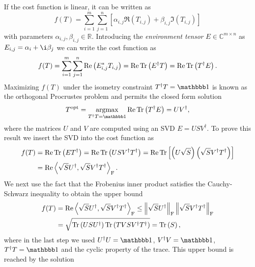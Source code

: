 If the cost function is linear, it can be written as
\begin{equation}
	f(T) = \sum_{i=1}^{m}\sum_{j=1}^{n}\left[\alpha_{i,j}\Re\left(T_{i,j}\right) + \beta_{i,j} \Im\left(T_{i,j}\right)\right]
\end{equation}
with parameters $\alpha_{i,j}, \beta_{i,j} \in \mathbb{R}$. Introducing the \textit{environment tensor} $E\in\mathbb{C}^{m\times n}$ as $E_{i,j} = \alpha_i + \i \beta_j$ we can write the cost function as
\begin{equation}
	f(T) = \sum_{i=1}^{m}\sum_{j=1}^{n} \operatorname{Re}\left(E_{i,j}^*T_{i,j}\right) = \operatorname{Re}\operatorname{Tr}\left(E^\dagger T\right) = \operatorname{Re}\operatorname{Tr}\left(T^\dagger E\right).
\end{equation}
Maximizing $f(T)$ under the isometry constraint $T^\dagger T = \id$ is known as the orthogonal Procrustes problem and permits the closed form solution
\begin{equation}
	\label{eq:orthogonal_procrustes_problem_closed_form_solution}
	T^\text{opt} = \underset{T^\dagger T = \id}{\argmax} \Re\Tr\left(T^\dagger E\right) = UV^\dagger,
\end{equation}
where the matrices $U$ and $V$ are computed using an SVD $E = USV^\dagger$. To prove this result we insert the SVD into the cost function as
\begin{equation}
	\begin{split}
	f(T) &= \operatorname{Re}\operatorname{Tr}\left(ET^\dagger\right) = \operatorname{Re}\operatorname{Tr}\left(USV^\dagger T^\dagger\right) = \operatorname{Re}\operatorname{Tr}\left[\left(U\sqrt{S}\right)\left(\sqrt{S}V^\dagger T^\dagger\right)\right] \\
	&= \operatorname{Re}\left\langle\sqrt{S}U^\dagger,\sqrt{S}V^\dagger T^\dagger\right\rangle_\text{F}.
	\end{split}
\end{equation}
We next use the fact that the Frobenius inner product satisfies the Cauchy-Schwarz inequality to obtain the upper bound
\begin{equation}
	\begin{split}
		f(T) &= \operatorname{Re}\left\langle\sqrt{S}U^\dagger,\sqrt{S}V^\dagger T^\dagger\right\rangle_\text{F} \le \left\lVert\sqrt{S}U^\dagger\right\rVert_\text{F}\left\lVert\sqrt{S}V^\dagger T^\dagger\right\rVert_\text{F} \\
		&= \sqrt{\operatorname{Tr}\left(USU^\dagger\right)\operatorname{Tr}\left(TVSV^\dagger T^\dagger\right)} = \operatorname{Tr}\left(S\right),
	\end{split}
\end{equation}
where in the last step we used $U^\dagger U = \id$, $V^\dagger V = \id$, $T^\dagger T = \id$ and the cyclic property of the trace. This upper bound is reached by the solution
